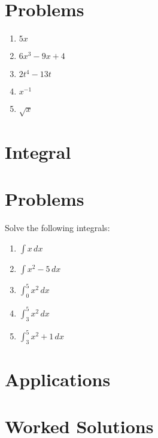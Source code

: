 \documentclass[12pt]{article}
\begin{document}
\section{Problems}
\begin{enumerate}
    \item $5x$
    \item $6x^3 - 9x + 4$
    \item $2t^4 - 13t$
    \item $x^{-1}$
    \item $\sqrt{x}$
\end{enumerate}

\section{Integral}



\section{Problems}
Solve the following integrals:

\begin{enumerate}
    \item $\int x \, dx$
    \item $\int x^2-5 \, dx$
    \item $\int^5_0 x^2 \, dx$
    \item $\int^5_3 x^2 \, dx$
    \item $\int^5_3 x^2 + 1 \, dx$
\end{enumerate}

\section{Applications}



\medskip

\section{Worked Solutions}







\end{document}
